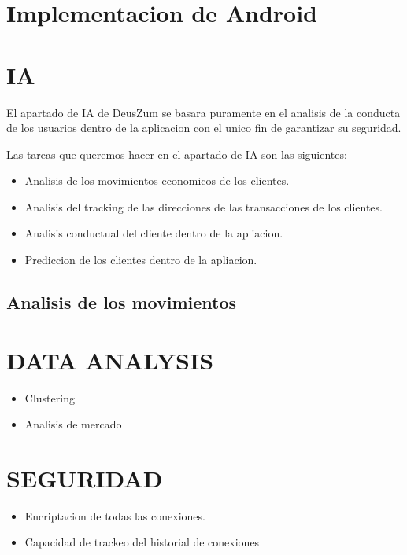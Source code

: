 \documentclass{article}
\theoremstyle{definition}
\begin{document}
\section{Implementacion de Android}




\section{IA}

El apartado de IA de DeusZum se basara puramente en el analisis de la conducta de los usuarios dentro de la aplicacion con el unico fin de garantizar su seguridad.

Las tareas que queremos hacer en el apartado de IA son las siguientes:

\begin{itemize}
    \item Analisis de los movimientos economicos de los clientes.
    \item Analisis del tracking de las direcciones de las transacciones de los clientes.
    \item Analisis conductual del cliente dentro de la apliacion.
    \item Prediccion de los clientes dentro de la apliacion.
\end{itemize}


\subsection{Analisis de los movimientos}

\subsection{}

\section{DATA ANALYSIS}

\begin{itemize}
    \item Clustering
    \item Analisis de mercado
\end{itemize}

\section{SEGURIDAD}

\begin{itemize}
    \item Encriptacion de todas las conexiones.
    \item Capacidad de trackeo del historial de conexiones
\end{itemize}
\end{document}
